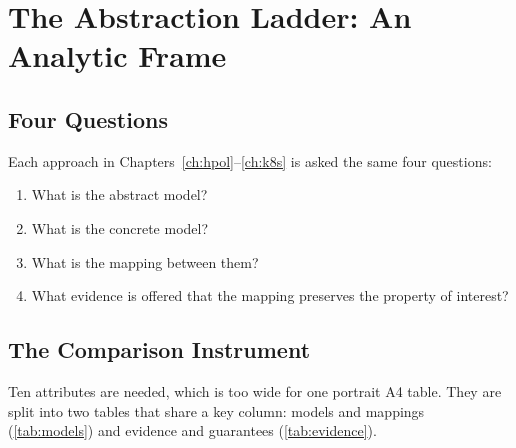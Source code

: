 \chapter{The Abstraction Ladder: An Analytic Frame}
\label{ch:ladder}

\section{Four Questions}
\label{sec:ladder-questions}
Each approach in Chapters~\ref{ch:hpol}--\ref{ch:k8s} is asked the same four questions:
\begin{enumerate}
  \item What is the abstract model?
  \item What is the concrete model?
  \item What is the mapping between them?
  \item What evidence is offered that the mapping preserves the property of interest?
\end{enumerate}

\section{The Comparison Instrument}
\label{sec:ladder-instrument}
Ten attributes are needed, which is too wide for one portrait A4 table. They are split
into two tables that share a key column: models and mappings
(\cref{tab:models}) and evidence and guarantees (\cref{tab:evidence}).
